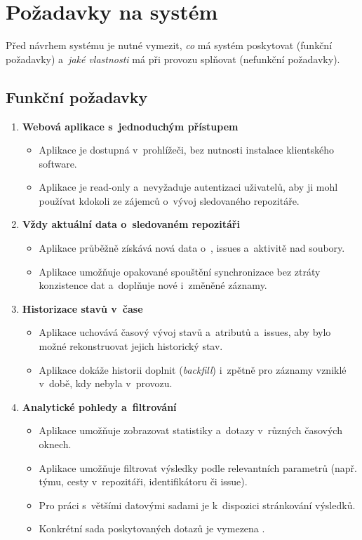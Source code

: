 \section{Požadavky na systém}
\label{sec:requirements}

Před návrhem systému je nutné vymezit, \emph{co} má systém poskytovat (funkční požadavky) a~\emph{jaké vlastnosti} má při provozu splňovat (nefunkční požadavky).

\subsection{Funkční požadavky}
\label{subsec:requirements:functional}

\begin{enumerate}
  \item \textbf{Webová aplikace s~jednoduchým přístupem}
    \begin{itemize}
      \item Aplikace je dostupná v~prohlížeči, bez nutnosti instalace klientského software.
      \item Aplikace je read-only a~nevyžaduje autentizaci uživatelů, aby ji mohl používat kdokoli ze zájemců o~vývoj sledovaného repozitáře.
    \end{itemize}

  \item \textbf{Vždy aktuální data o~sledovaném repozitáři}
    \begin{itemize}
      \item Aplikace průběžně získává nová data o~\PR, issues a~aktivitě nad soubory.
      \item Aplikace umožňuje opakované spouštění synchronizace bez ztráty konzistence dat a~doplňuje nové i~změněné záznamy.
    \end{itemize}

  \item \textbf{Historizace stavů v~čase}
    \begin{itemize}
      \item Aplikace uchovává časový vývoj stavů a~atributů \PR a~issues, aby bylo možné rekonstruovat jejich historický stav.
      \item Aplikace dokáže historii doplnit (\emph{backfill}) i~zpětně pro záznamy vzniklé v~době, kdy nebyla v~provozu.
    \end{itemize}

  \item \textbf{Analytické pohledy a~filtrování}
    \begin{itemize}
      \item Aplikace umožňuje zobrazovat statistiky a~dotazy v~různých časových oknech.
      \item Aplikace umožňuje filtrovat výsledky podle relevantních parametrů (např. týmu, cesty v~repozitáři, identifikátoru \PR či issue).
      \item Pro práci s~většími datovými sadami je k~dispozici stránkování výsledků.
      \item Konkrétní sada poskytovaných dotazů je vymezena .
    \end{itemize}


\end{enumerate}
